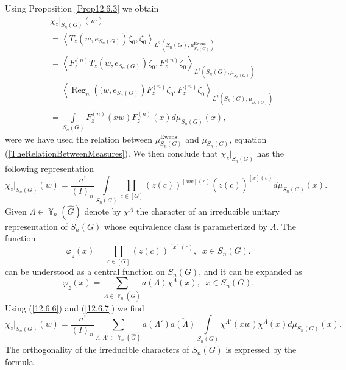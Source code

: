 \documentclass[12pt]{amsart}
\theoremstyle{definition}
\numberwithin{equation}{section}
\DeclareMathOperator{\Y}{\mathbb{Y}}
\DeclareMathOperator{\Ewens}{Ewens}
\DeclareMathOperator{\Reg}{Reg}
\begin{document}
Using Proposition \ref{Prop12.6.3} we obtain
\begin{equation}\label{12.6.5}
\begin{split}
&\chi_z\vert_{S_n(G)}(w)\\
&=\left<T_z\left(w,e_{S_n(G)}\right)\zeta_0,\zeta_0\right>_{L^2\left(S_n(G),\mu_{S_n(G)}^{\Ewens}\right)}
\\
&=\left<F_z^{(n)}T_z\left(w,e_{S_n(G)}\right)\zeta_0,F_z^{(n)}\zeta_0\right>_{L^2\left(S_n(G),\mu_{S_n(G)}\right)}
\\
&=\left<\Reg_n\left((w,e_{S_n(G)}\right)F_z^{(n)}\zeta_0,F_z^{(n)}\zeta_0\right>_{L^2\left(S_n(G),\mu_{S_n(G)}\right)}\\
&=\int\limits_{S_n(G)}F_z^{(n)}(xw)\overline{F_z^{(n)}(x)}d\mu_{S_n(G)}(x),
\end{split}
\end{equation}
were we have used the relation between $\mu^{\Ewens}_{S_n(G)}$ and $\mu_{S_n(G)}$, equation (\ref{TheRelationBetweenMeasures}).
We then conclude that $\chi_z\vert_{S_n(G)}$ has the following representation
\begin{equation}\label{12.6.6}
\chi_z\vert_{S_n(G)}(w)=\frac{n!}{(I)_n}\int\limits_{S_n(G)}\prod\limits_{c\in [G]}
\left(z(c)\right)^{[xw](c)}\left(\overline{z(c)}\right)^{[x](c)}d\mu_{S_n(G)}(x).
\end{equation}
Given $\Lambda\in\Y_n\left(\widehat{G}\right)$ denote by $\chi^{\Lambda}$ the character of an irreducible unitary representation of $S_n(G)$ whose equivalence class is parameterized by $\Lambda$. The function
\begin{equation}\label{ch1.1.1}
\varphi_z(x)=\prod\limits_{c\in [G]}\left(z(c)\right)^{[x](c)},\;\; x\in S_n(G).
\end{equation}
can be understood as a central function on $S_n(G)$, and it can be expanded as
\begin{equation}\label{12.6.7}
\varphi_z(x)
=\sum\limits_{\Lambda\in\Y_n\left(\widehat{G}\right)}a\left(\Lambda\right)\chi^{\Lambda}(x),
\;\; x\in S_n(G).
\end{equation}
Using (\ref{12.6.6}) and (\ref{12.6.7}) we find
\begin{equation}
\chi_z\vert_{S_n(G)}(w)=\frac{n!}{(I)_n}
\sum\limits_{\Lambda,\Lambda'\in\Y_n\left(\widehat{G}\right)}a\left(\Lambda'\right)\overline{a\left(\Lambda\right)}
\int\limits_{S_n(G)}\chi^{\Lambda'}(xw)\overline{\chi^{\Lambda}(x)}d\mu_{S_n(G)}(x).
\end{equation}
The orthogonality of the irreducible characters of $S_n(G)$ is expressed by the formula
\end{document}
